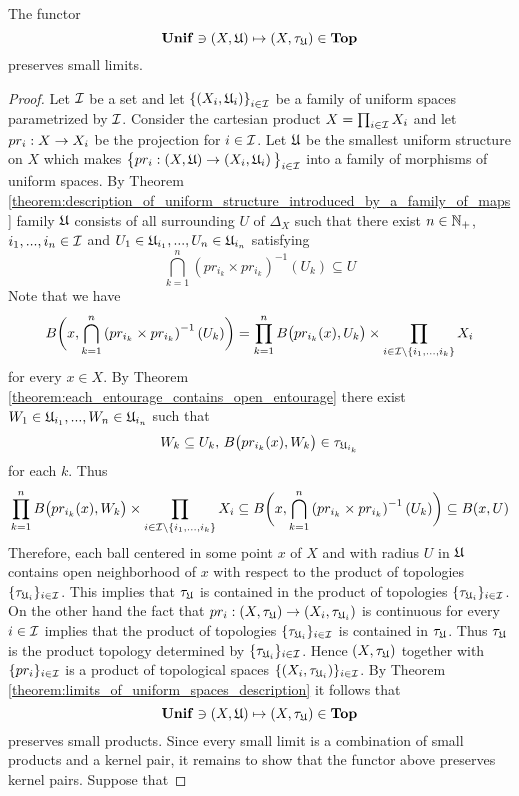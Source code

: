 \begin{theorem}\label{theorem:induced_topology_functor_preserves_limits_of_uniform_spaces}
The functor 
$$\mathbf{Unif} \ni (X,{\mathfrak U}) \mapsto (X,\tau_{{\mathfrak U}}) \in \mathbf{Top}$$
preserves small limits.
\end{theorem}
\begin{proof}
Let ${\mathcal I}$ be a set and let $\left\{\left(X_i,{\mathfrak U}_i\right)\right\}_{i\in {\mathcal I}}$ be a family of uniform spaces parametrized by ${\mathcal I}$. Consider the cartesian product $X = \prod_{i\in {\mathcal I}}X_i$ and let $pr_i:X\rightarrow X_i$ be the projection for $i\in {\mathcal I}$. Let ${\mathfrak U}$ be the smallest uniform structure on $X$ which makes $\big\{pr_i:\left(X,{\mathfrak U}\right) \rightarrow \left(X_i,{\mathfrak U}_i\right)\big\}_{i\in {\mathcal I}}$ into a family of morphisms of uniform spaces. By Theorem \ref{theorem:description_of_uniform_structure_introduced_by_a_family_of_maps} family ${\mathfrak U}$ consists of all surrounding $U$ of $\Delta_X$ such that there exist $n\in {\mathbb N}_+$, $i_1,...,i_n\in {\mathcal I}$ and $U_1 \in {\mathfrak U}_{i_1},...,U_n\in {\mathfrak U}_{i_n}$ satisfying
$$\bigcap_{k=1}^n\left(pr_{i_k}\times pr_{i_k}\right)^{-1}(U_k) \subseteq U$$
Note that we have
$$B\bigg(x, \bigcap_{k=1}^n\left(pr_{i_k}\times pr_{i_k}\right)^{-1}(U_k)\bigg) = \prod_{k=1}^nB\big(pr_{i_k}(x), U_k\big)\times \prod_{i\in {\mathcal I}\setminus \{i_1,...,i_k\}}X_i$$
for every $x \in X$. By Theorem \ref{theorem:each_entourage_contains_open_entourage} there exist $W_1 \in {\mathfrak U}_{i_1},...,W_n \in {\mathfrak U}_{i_n}$ such that 
$$W_k\subseteq U_k,\,B\big(pr_{i_k}(x), W_k\big) \in \tau_{{\mathfrak U}_{i_k}}$$
for each $k$. Thus
$$\prod_{k=1}^nB\big(pr_{i_k}(x), W_k\big) \times \prod_{i\in {\mathcal I}\setminus \{i_1,...,i_k\}}X_i \subseteq B\bigg(x, \bigcap_{k=1}^n\left(pr_{i_k}\times pr_{i_k}\right)^{-1}(U_k)\bigg) \subseteq B(x,U)$$
Therefore, each ball centered in some point $x$ of $X$ and with radius $U$ in ${\mathfrak U}$ contains open neighborhood of $x$ with respect to the product of topologies $\{\tau_{{\mathfrak U}_i}\}_{i\in  {\mathcal I}}$. This implies that $\tau_{{\mathfrak U}}$ is contained in the product of topologies $\{\tau_{{\mathfrak U}_i}\}_{i\in  {\mathcal I}}$. On the other hand the fact that $pr_i:(X,\tau_{{\mathfrak U}}) \rightarrow (X_i,\tau_{{\mathfrak U}_i})$ is continuous for every $i\in {\mathcal I}$ implies that the product of topologies $\{\tau_{{\mathfrak U}_i}\}_{i\in {\mathcal I}}$ is contained in $\tau_{{\mathfrak U}}$. Thus $\tau_{{\mathfrak U}}$ is the product topology determined by $\{\tau_{{\mathfrak U}_i}\}_{i\in {\mathcal I}}$. Hence $(X,\tau_{{\mathfrak U}})$ together with $\{pr_i\}_{i\in {\mathcal I}}$ is a product of topological spaces $\{(X_i,\tau_{{\mathfrak U}_i})\}_{i\in {\mathcal I}}$. By Theorem \ref{theorem:limits_of_uniform_spaces_description} it follows that
$$\mathbf{Unif} \ni (X,{\mathfrak U}) \mapsto (X,\tau_{{\mathfrak U}}) \in \mathbf{Top}$$
preserves small products. Since every small limit is a combination of small products and a kernel pair, it remains to show that the functor above preserves kernel pairs. Suppose that 

\end{proof}
